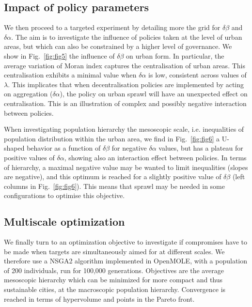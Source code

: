 \documentclass[11pt]{article}
\begin{document}
\subsection{Impact of policy parameters}


We then proceed to a targeted experiment by detailing more the grid for $\delta \beta$ and $\delta \alpha$. The aim is to investigate the influence of policies taken at the level of urban areas, but which can also be constrained by a higher level of governance. We show in Fig.~\ref{fig:fig5} the influence of $\delta \beta$ on urban form. In particular, the average variation of Moran index captures the centralisation of urban areas. This centralisation exhibits a minimal value when $\delta \alpha$ is low, consistent across values of $\lambda$. This implicates that when decentralisation policies are implemented by acting on aggregation ($\delta \alpha$), the policy on urban sprawl will have an unexpected effect on centralisation. This is an illustration of complex and possibly negative interaction between policies.

When investigating population hierarchy the mesoscopic scale, i.e. inequalities of population distribution within the urban area, we find in Fig.~\ref{fig:fig6} a U-shaped behavior as a function of $\delta \beta$ for negative $\delta \alpha$ values, but has a plateau for positive values of $\delta \alpha$, showing also an interaction effect between policies. In terms of hierarchy, a maximal negative value may be wanted to limit inequalities (slopes are negative), and this optimum is reached for a slightly positive value of $\delta \beta$ (left columns in Fig.~\ref{fig:fig6}). This means that sprawl may be needed in some configurations to optimise this objective.


\subsection{Multiscale optimization}

We finally turn to an optimization objective to investigate if compromises have to be made when targets are simultaneously aimed for at different scales. We therefore use a NSGA2 algorithm implemented in OpenMOLE, with a population of 200 individuals, run for 100,000 generations. Objectives are the average mesoscopic hierarchy which can be minimized for more compact and thus sustainable cities, at the macroscopic population hierarchy. Convergence is reached in terms of hypervolume and points in the Pareto front.
\end{document}
